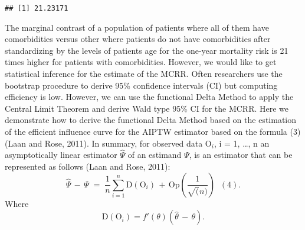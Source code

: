 \documentclass[]{article}
\newenvironment{Shaded}{\begin{snugshade}}{\end{snugshade}}
\newcommand{\DecValTok}[1]{\textcolor[rgb]{0.00,0.00,0.81}{#1}}
\newcommand{\KeywordTok}[1]{\textcolor[rgb]{0.13,0.29,0.53}{\textbf{#1}}}
\newcommand{\NormalTok}[1]{#1}
\newcommand{\OperatorTok}[1]{\textcolor[rgb]{0.81,0.36,0.00}{\textbf{#1}}}
\newcommand{\StringTok}[1]{\textcolor[rgb]{0.31,0.60,0.02}{#1}}
\begin{document}
\begin{Shaded}
\end{Shaded}

\begin{verbatim}
## [1] 21.23171
\end{verbatim}

The marginal contrast of a population of patients where all of them have
comorbidities versus other where patients do not have comorbidities
after standardizing by the levels of patients age for the one-year
mortality risk is 21 times higher for patients with comorbidities.
However, we would like to get statistical inference for the estimate of
the MCRR. Often researchers use the bootstrap procedure to derive 95\%
confidence intervals (CI) but computing efficiency is low. However, we
can use the functional Delta Method to apply the Central Limit Theorem
and derive Wald type 95\% CI for the MCRR. Here we demonstrate how to
derive the functional Delta Method based on the estimation of the
efficient influence curve for the AIPTW estimator based on the formula
(3) (Laan and Rose, 2011). In summary, for observed data \(\text{O}_i\),
i = 1, \ldots, n an asymptotically linear estimator \(\hat\Psi\) of an
estimand \(\Psi\), is an estimator that can be represented as follows
(Laan and Rose, 2011):
\[\hat\Psi\,-\,\Psi\;=\;\frac{1}{n}\sum_{i=1}^n \text{D}(\text{O}_{i})\,+\,\text{Op}(\frac{1}{\sqrt(n)})\;\;(4).\]
Where\\
\[\text{D}(\text{O}_{i})=f'(\theta)(\hat\theta\,-\,\theta).\]
\end{document}
